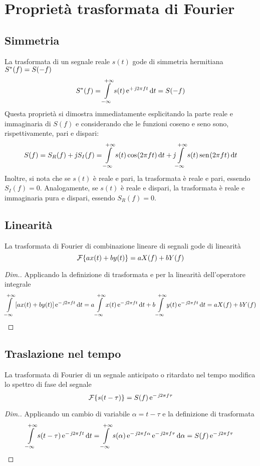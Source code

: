 \section{Proprietà trasformata di Fourier}
\subsection{Simmetria}
La trasformata di un segnale reale $s(t)$ gode di simmetria hermitiana ${S}^\ast(f)=S(-f)$
\begin{equation}
	{S}^\ast(f)=\int\limits_{-\infty}^{+\infty}{s(t)\operatorname{e}^{+\operatorname{\mathit{j}\!} 2\pi f t}}{\,\mathop{}\!\mathrm{d}{t}}=S(-f)
\end{equation}
Questa proprietà si dimostra immediatamente esplicitando la parte reale e immaginaria di $S(f)$ e considerando che le funzioni coseno e seno sono, rispettivamente, pari e dispari: 
\[
	S(f)=S_R(f)+\operatorname{\mathit{j}\!} S_I(f)=\int\limits_{-\infty}^{+\infty}{s(t)\,{\operatorname{cos}}^{}\!\left({2\pi f t}\right)}{\,\mathop{}\!\mathrm{d}{t}}+\operatorname{\mathit{j}\!}\int\limits_{-\infty}^{+\infty}{s(t)\,{\operatorname{sen}}^{}\!\left({2\pi f t}\right)}{\,\mathop{}\!\mathrm{d}{t}}
\]
Inoltre, si nota che se $s(t)$ è reale e pari, la trasformata è reale e pari, essendo $S_I(f)=0$.
Analogamente, se $s(t)$ è reale e dispari, la trasformata è reale e immaginaria pura e dispari, essendo $S_R(f)=0$.

\subsection{Linearità}
La trasformata di Fourier di combinazione lineare di segnali gode di linearità
\begin{equation}
	\operatorname{\mathcal{F}}\!\left\lbrace{a x(t)+b y(t)}\right\rbrace= a X(f)+b Y(f)
\end{equation}

\begin{proof}[Dim.]
Applicando la definizione di trasformata e per la linearità dell'operatore integrale
\[
	 \int\limits_{-\infty}^{+\infty}{\left[a x(t)+b y(t)\right]\operatorname{e}^{-\operatorname{\mathit{j}\!} 2\pi f t}}{\,\mathop{}\!\mathrm{d}{t}}= a\int\limits_{-\infty}^{+\infty}{x(t)\operatorname{e}^{-\operatorname{\mathit{j}\!} 2\pi f t}}{\,\mathop{}\!\mathrm{d}{t}}+b\int\limits_{-\infty}^{+\infty}{y(t)\operatorname{e}^{-\operatorname{\mathit{j}\!} 2\pi f t}}{\,\mathop{}\!\mathrm{d}{t}}=a X(f)+b Y(f)
\qedhere
\]
\end{proof}

\subsection{Traslazione nel tempo}
La trasformata di Fourier di un segnale anticipato o ritardato nel tempo modifica lo spettro di fase del segnale
\begin{equation}
\label{eq:trasf_Fourier_trasl}
	\fourier{s(t-\tau)}= S(f)\e{-\imath 2\pi f \tau}
\end{equation}
\begin{proof}[Dim.]
Applicando un cambio di variabile $\alpha=t-\tau$ e la definizione di trasformata
\[
	\int\limits_{-\infty}^{+\infty}{s(t-\tau)\operatorname{e}^{-\operatorname{\mathit{j}\!} 2\pi f t}}{\,\mathop{}\!\mathrm{d}{t}}=
	\int\limits_{-\infty}^{+\infty}{s(\alpha)\operatorname{e}^{-\operatorname{\mathit{j}\!} 2\pi f\alpha}\operatorname{e}^{-\operatorname{\mathit{j}\!} 2\pi f\tau}}{\,\mathop{}\!\mathrm{d}{\alpha}}=S(f)\operatorname{e}^{-\operatorname{\mathit{j}\!} 2\pi f\tau}
\qedhere
\]
\end{proof}

